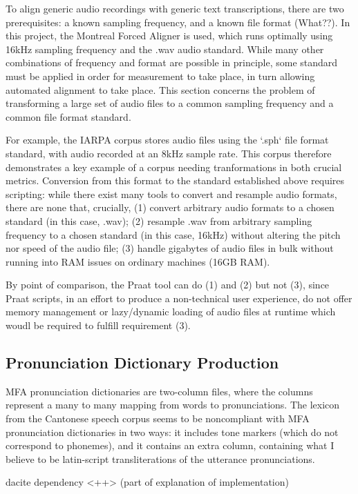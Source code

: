 \documentclass[11pt]{article}
\begin{document}
To align generic audio recordings with generic text transcriptions, there are two prerequisites: a known sampling frequency, and a known file format (What??). In this project, the Montreal Forced Aligner is used, which runs optimally using 16kHz sampling frequency and the .wav audio standard. While many other combinations of frequency and format are possible in principle, some standard must be applied in order for measurement to take place, in turn allowing automated alignment to take place. This section concerns the problem of transforming a large set of audio files to a common sampling frequency and a common file format standard.

For example, the IARPA corpus stores audio files using the `.sph` file format standard, with audio recorded at an 8kHz sample rate. This corpus therefore demonstrates a key example of a corpus needing tranformations in both crucial metrics. Conversion from this format to the standard established above requires scripting: while there exist many tools to convert and resample audio formats, there are none that, crucially, (1) convert arbitrary audio formats to a chosen standard (in this case, .wav); (2) resample .wav from arbitrary sampling frequency to a chosen standard (in this case, 16kHz) without altering the pitch nor speed of the audio file; (3) handle gigabytes of audio files in bulk without running into RAM issues on ordinary machines (16GB RAM).

By point of comparison, the Praat tool can do (1) and (2) but not (3), since Praat scripts, in an effort to produce a non-technical user experience, do not offer memory management or lazy/dynamic loading of audio files at runtime which woudl be required to fulfill requirement (3).



\subsection{Pronunciation Dictionary Production}

MFA pronunciation dictionaries are two-column files, where the columns represent a many to many mapping from words to pronunciations. The lexicon from the Cantonese speech corpus seems to be noncompliant with MFA pronunciation dictionaries in two ways: it includes tone markers (which do not correspond to phonemes), and it contains an extra column, containing what I believe to be latin-script transliterations of the utterance pronunciations.

dacite dependency <++> (part of explanation of implementation)
\end{document}
